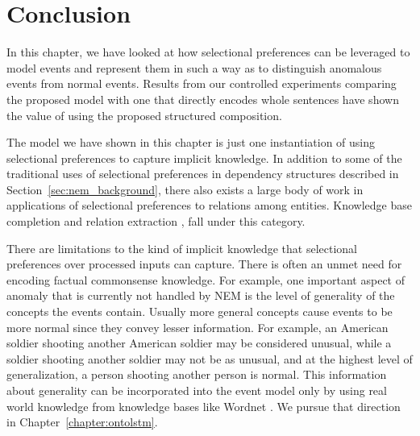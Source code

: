 \section{Conclusion}
In this chapter, we have looked at how selectional preferences can be leveraged to model events and represent
them in such a way as to distinguish anomalous events from normal events. Results from our controlled experiments
comparing the proposed model with one that directly encodes whole sentences have shown the value of using the proposed structured
composition.

The model we have shown in this chapter is just one instantiation of using selectional preferences to capture implicit knowledge.
In addition to some of the traditional uses of selectional preferences in dependency structures described in Section~\ref{sec:nem_background},
there also exists a large body of work in applications of selectional preferences to relations among entities. Knowledge base completion and 
relation extraction
\citep[among others]{mintz2009distant,sutskever2009modelling,nickel2011three,bordes2011learning,socher2013reasoning,gardner2014incorporating},
fall under this category.

There are limitations to the kind of implicit knowledge that selectional preferences over processed inputs can capture.
There is often an unmet need for encoding factual commonsense knowledge. 
For example, one important aspect of anomaly that is currently not handled by NEM
is the level of generality of the concepts the events contain.  Usually
more general concepts cause events to be more normal since they convey
lesser information.  For example, an American soldier shooting another American
soldier
may be considered unusual, while a soldier shooting another soldier may not be
as unusual, and at the 
highest level of generalization, a person shooting another person is normal. 
This information about generality can be incorporated into the event model only
by using real world knowledge from knowledge bases like Wordnet \citep{miller1995wordnet}. We pursue that direction
in Chapter~\ref{chapter:ontolstm}.